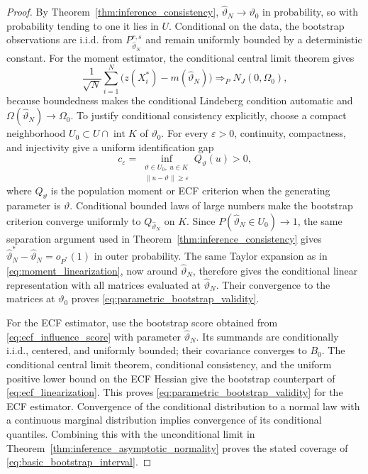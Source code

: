 \documentclass[11pt]{amsart}
\numberwithin{equation}{section}\setcounter{tocdepth}{3}\setcounter{secnumdepth}{3}
\begin{document}
\begin{proof}
By Theorem~\ref{thm:inference_consistency},
$\widehat\vartheta_N\to\vartheta_0$ in probability, so with probability tending to one it
lies in $U$.  Conditional on the data, the bootstrap observations are i.i.d. from
$P_{\widehat\vartheta_N}^{r,s}$ and remain uniformly bounded by a deterministic constant.
For the moment estimator, the conditional central limit theorem gives
\begin{equation}
 \frac1{\sqrt N}\sum_{i=1}^N
 \bigl(z(X_i^*)-m(\widehat\vartheta_N)\bigr)
 \Longrightarrow_P N_J(0,\Omega_0),
 \label{eq:bootstrap_moment_clt}
\end{equation}
because boundedness makes the conditional Lindeberg condition automatic and
$\Omega(\widehat\vartheta_N)\to\Omega_0$.  To justify conditional consistency explicitly, choose a compact neighborhood
$U_0\subset U\cap\operatorname{int}K$ of $\vartheta_0$.  For every $\varepsilon>0$,
continuity, compactness, and injectivity give a uniform identification gap
\begin{equation}
 c_\varepsilon=\inf_{\substack{\vartheta\in U_0,\ u\in K\\
                         \|u-\vartheta\|\ge\varepsilon}}
 Q_\vartheta(u)>0,
 \label{eq:bootstrap_uniform_identification_gap}
\end{equation}
where $Q_\vartheta$ is the population moment or ECF criterion when the generating
parameter is $\vartheta$.  Conditional bounded laws of large numbers make the bootstrap
criterion converge uniformly to $Q_{\widehat\vartheta_N}$ on $K$.  Since
$P(\widehat\vartheta_N\in U_0)\to1$, the same separation argument used in
Theorem~\ref{thm:inference_consistency} gives
$\widehat\vartheta_N^*-\widehat\vartheta_N=o_{P^*}(1)$ in outer probability.  The same
Taylor expansion as in \eqref{eq:moment_linearization}, now around
$\widehat\vartheta_N$, therefore gives the conditional linear representation with all
matrices evaluated at $\widehat\vartheta_N$.  Their convergence to the matrices at
$\vartheta_0$ proves \eqref{eq:parametric_bootstrap_validity}.

For the ECF estimator, use the bootstrap score obtained from
\eqref{eq:ecf_influence_score} with parameter $\widehat\vartheta_N$.  Its summands are
conditionally i.i.d., centered, and uniformly bounded; their covariance converges to
$B_0$.  The conditional central limit theorem, conditional consistency, and the uniform
positive lower bound on the ECF Hessian give the bootstrap counterpart of
\eqref{eq:ecf_linearization}.  This proves \eqref{eq:parametric_bootstrap_validity} for
the ECF estimator.  Convergence of the conditional distribution to a normal law with a
continuous marginal distribution implies convergence of its conditional quantiles.
Combining this with the unconditional limit in
Theorem~\ref{thm:inference_asymptotic_normality} proves the stated coverage of
\eqref{eq:basic_bootstrap_interval}.
\end{proof}
\end{document}
